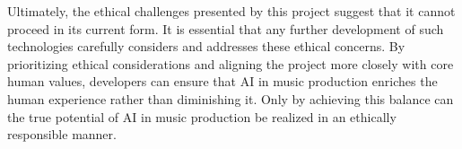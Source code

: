 \documentclass[10pt,twocolumn]{article}
\begin{document}
Ultimately, the ethical challenges presented by this project suggest that it cannot proceed in its current form. It is essential that any further development of such technologies carefully considers and addresses these ethical concerns. By prioritizing ethical considerations and aligning the project more closely with core human values, developers can ensure that AI in music production enriches the human experience rather than diminishing it. Only by achieving this balance can the true potential of AI in music production be realized in an ethically responsible manner.


\printbibliography
\end{document}
